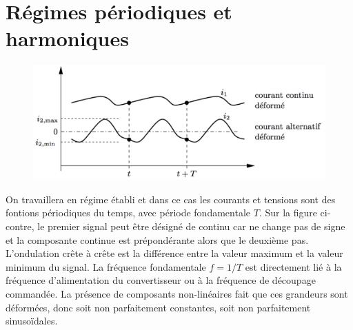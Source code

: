 \section{Régimes périodiques et harmoniques}
	\begin{figure}
	\vspace{-5mm}
	\includegraphics[scale=0.25]{ch1/6}
	\end{figure}		
	On travaillera en régime établi et dans ce cas les courants et tensions sont des fontions périodiques du temps, avec période fondamentale $T$. Sur la figure ci-contre, le premier signal peut être désigné de continu car ne change pas de signe et la composante continue est prépondérante alors que le deuxième pas.
	L'ondulation crête à crête est la différence entre la valeur maximum et la valeur minimum du signal. La fréquence fondamentale $f=1/T$ est directement lié à la fréquence d'alimentation du convertisseur ou à la fréquence de découpage commandée. La présence de composants non-linéaires fait que ces grandeurs sont déformées, donc soit non parfaitement constantes, soit non parfaitement sinusoïdales. 
		
